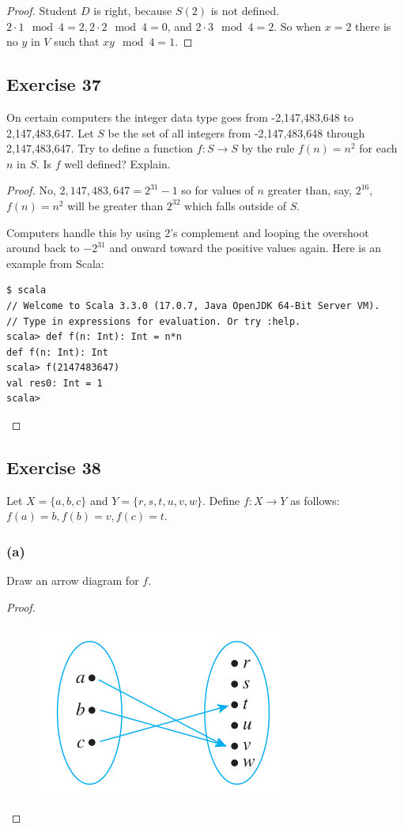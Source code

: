 \documentclass[14pt]{extarticle}
\begin{document}
\begin{proof}
Student $D$ is right, because $S(2)$ is not defined. \(2 \cdot 1 \mod 4 = 2, 2 \cdot 2 \mod 4 = 0\), and
\(2 \cdot 3 \mod 4 = 2\). So when $x = 2$ there is no $y$ in $V$ such that \(xy \mod 4 = 1\).
\end{proof}

\subsection{Exercise 37}
On certain computers the integer data type goes from -2,147,483,648 to 2,147,483,647. Let $S$ be the set of 
all integers from -2,147,483,648 through 2,147,483,647. Try to define a function \(f: S \to S\) by the rule 
\(f(n) = n^2\) for each $n$ in $S$. Is $f$ well defined? Explain.

\begin{proof}
No, \(2,147,483,647 = 2^{31} - 1\) so for values of $n$ greater than, say, $2^{16}$, \(f(n) = n^2\) will be greater 
than $2^{32}$ which falls outside of $S$. 

Computers handle this by using 2's complement and looping the overshoot around back to \(-2^{31}\) and onward toward 
the positive values again. Here is an example from Scala:

\begin{verbatim}
$ scala
// Welcome to Scala 3.3.0 (17.0.7, Java OpenJDK 64-Bit Server VM). 
// Type in expressions for evaluation. Or try :help.
scala> def f(n: Int): Int = n*n
def f(n: Int): Int                                    
scala> f(2147483647)
val res0: Int = 1
scala> 
\end{verbatim}
\end{proof}

\subsection{Exercise 38}
Let \(X = \{a,b,c\}\) and \(Y = \{r,s,t,u,v,w\}\). Define \(f: X \to Y\) as follows: \(f(a) = b, f(b) = v, f(c) = t\).

\subsubsection{(a)}
Draw an arrow diagram for $f$.

\begin{proof}
\begin{figure}[ht!]
\centering
\includegraphics[scale=0.5]{../images/7.1.38.a.png}
\end{figure}
\end{proof}
\end{document}
